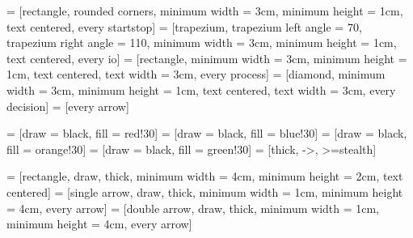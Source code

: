 
 = [rectangle, rounded corners, minimum width = 3cm, minimum height = 1cm, text centered, every startstop]
 = [trapezium, trapezium left angle = 70, trapezium right angle = 110, minimum width = 3cm, minimum height = 1cm, text centered, every io]
 = [rectangle, minimum width = 3cm, minimum height = 1cm, text centered, text width = 3cm, every process]
 = [diamond, minimum width = 3cm, minimum height = 1cm, text centered, text width = 3cm, every decision]
  = [every arrow]

  = [draw = black, fill = red!30]
  = [draw = black, fill = blue!30]
  = [draw = black, fill = orange!30]
  = [draw = black, fill = green!30]
  = [thick, ->, >=stealth]

 = [rectangle, draw, thick, minimum width = 4cm, minimum height = 2cm, text centered]
 = [single arrow, draw, thick, minimum width = 1cm, minimum height = 4cm, every arrow]
 = [double arrow, draw, thick, minimum width = 1cm, minimum height = 4cm, every arrow]


\graphicspath{
	{Images/}
	{Images/Slides/}
	{Images/Icons/}
}


